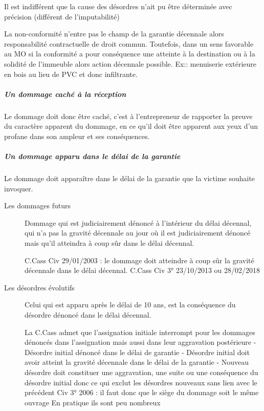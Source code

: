 				Il est indifférent que la cause des désordres n’ait pu être déterminée avec précision (différent de l’imputabilité)

				La non-conformité n’entre pas le champ de la garantie décennale alors responsabilité contractuelle de droit commun. Toutefois, dans un sens favorable au MO si la conformité a pour conséquence une atteinte à la destination ou à la solidité de l’immeuble alors action décennale possible.
				Ex:: menuiserie extérieure en bois au lieu de PVC et donc infiltrante.

				\subparagraph{Un dommage caché à la réception}

					Le dommage doit donc être caché, c’est à l’entrepreneur de rapporter la preuve du caractère apparent du dommage, en ce qu’il doit être apparent aux yeux d’un profane dans son ampleur et ses conséquences.

				\subparagraph{Un dommage apparu dans le délai de la garantie}

					Le dommage doit apparaître dans le délai de la garantie que la victime souhaite invoquer.

					\begin{description}
						\item[Les dommages futurs] Dommage qui est judiciairement dénoncé à l’intérieur du délai décennal, qui n’a pas la gravité décennale au jour où il est judiciairement dénoncé mais qu’il atteindra à coup sûr dans le délai décennal.

						C.Cass Civ 29/01/2003 : le dommage doit atteindre à coup sûr la gravité décennale dans le délai décennal.
						C.Cass Civ 3° 23/10/2013 ou 28/02/2018


						\item[Les désordres évolutifs] Celui qui est apparu après le délai de 10 ans, est la conséquence du désordre dénoncé dans le délai décennal.

						La C.Cass admet que l’assignation initiale interrompt pour les dommages dénoncés dans l’assignation mais aussi dans leur aggravation postérieure
						-	Désordre initial dénoncé dans le délai de garantie
						-	Désordre initial doit avoir atteint la gravité décennale dans le délai de la garantie
						-	Nouveau désordre doit constituer une aggravation, une suite ou une conséquence du désordre initial donc ce qui exclut les désordres nouveaux sans lien avec le précédent
						Civ 3° 2006 : il faut donc que le siège du dommage soit le même ouvrage
						En pratique ils sont peu nombreux

					\end{description}





